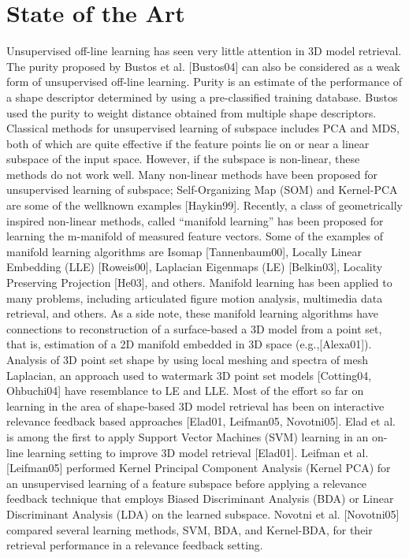 \documentclass[journal]{IEEEtran}
\begin{document}
\section{State of the Art}
Unsupervised off-line learning has seen very little
attention in 3D model retrieval. The purity proposed by
Bustos et al. [Bustos04] can also be considered as a
weak form of unsupervised off-line learning. Purity is
an estimate of the performance of a shape descriptor
determined by using a pre-classified training database.
Bustos used the purity to weight distance obtained from
multiple shape descriptors.
Classical methods for unsupervised learning of
subspace includes PCA and MDS, both of which are
quite effective if the feature points lie on or near a
linear subspace of the input space. However, if the
subspace is non-linear, these methods do not work well.
Many non-linear methods have been proposed for
unsupervised learning of subspace; Self-Organizing
Map (SOM) and Kernel-PCA are some of the wellknown
examples [Haykin99]. Recently, a class of
geometrically inspired non-linear methods, called
“manifold learning” has been proposed for learning the
m-manifold of measured feature vectors. Some of the
examples of manifold learning algorithms are Isomap
[Tannenbaum00], Locally Linear Embedding (LLE)
[Roweis00], Laplacian Eigenmaps (LE) [Belkin03],
Locality Preserving Projection [He03], and others.
Manifold learning has been applied to many problems,
including articulated figure motion analysis, multimedia
data retrieval, and others.
As a side note, these manifold learning algorithms
have connections to reconstruction of a surface-based a 
3D model from a point set, that is, estimation of a 2D
manifold embedded in 3D space (e.g.,[Alexa01]).
Analysis of 3D point set shape by using local meshing
and spectra of mesh Laplacian, an approach used to
watermark 3D point set models [Cotting04, Ohbuchi04]
have resemblance to LE and LLE.
Most of the effort so far on learning in the area of
shape-based 3D model retrieval has been on interactive
relevance feedback based approaches [Elad01,
Leifman05, Novotni05]. Elad et al. is among the first to
apply Support Vector Machines (SVM) learning in an
on-line learning setting to improve 3D model retrieval
[Elad01]. Leifman et al. [Leifman05] performed Kernel
Principal Component Analysis (Kernel PCA) for an
unsupervised learning of a feature subspace before
applying a relevance feedback technique that employs
Biased Discriminant Analysis (BDA) or Linear
Discriminant Analysis (LDA) on the learned subspace.
Novotni et al. [Novotni05] compared several learning
methods, SVM, BDA, and Kernel-BDA, for their
retrieval performance in a relevance feedback setting. 
\end{document}
